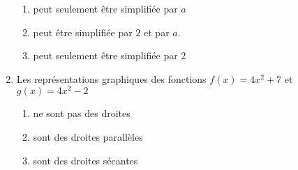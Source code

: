 \begin{exercice}[\ldots/4]
\begin{multicols}{2}
\begin{enumerate}
    \begin{enumerate}
        \item
            peut seulement être simplifiée par \( a\)
        \item
            peut être simplifiée par \( 2\) et par \( a\).
        \item
            peut seulement être simplifiée par \( 2\)
    \end{enumerate}

\item

    Les représentations graphiques des fonctions \( f(x)=4x^2+7\) et \( g(x)=4x^2-2\)
    \begin{enumerate}
        \item
            ne sont pas des droites
        \item
            sont des droites parallèles
        \item
            sont des droites sécantes
    \end{enumerate}

    \end{enumerate}
    \end{multicols}

\end{exercice}
